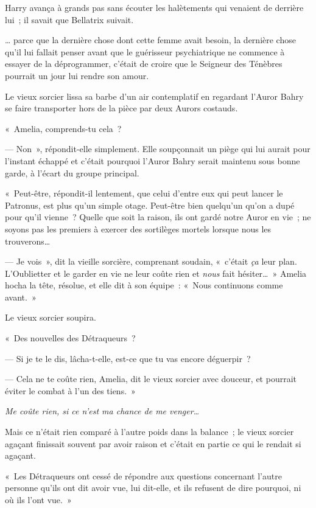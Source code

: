 Harry avança à grands pas sans écouter les halètements qui venaient de derrière lui~; il savait que Bellatrix suivait.

… parce que la dernière chose dont cette femme avait besoin, la dernière chose qu'il lui fallait penser avant que le guérisseur psychiatrique ne commence à essayer de la déprogrammer, c'était de croire que le Seigneur des Ténèbres pourrait un jour lui rendre son amour.

\later

Le vieux sorcier lissa sa barbe d'un air contemplatif en regardant l'Auror Bahry se faire transporter hors de la pièce par deux Aurors costauds.

«~Amelia, comprends-tu cela~?

--- Non~», répondit-elle simplement. Elle soupçonnait un piège qui lui aurait pour l'instant échappé et c'était pourquoi l'Auror Bahry serait maintenu sous bonne garde, à l'écart du groupe principal.

«~Peut-être, répondit-il lentement, que celui d'entre eux qui peut lancer le Patronus, est plus qu'un simple otage. Peut-être bien quelqu'un qu'on a dupé pour qu'il vienne~? Quelle que soit la raison, ils ont gardé notre Auror en vie~; ne soyons pas les premiers à exercer des sortilèges mortels lorsque nous les trouverons…

--- Je vois~», dit la vieille sorcière, comprenant soudain, «~c'était \emph{ça} leur plan. L'Oublietter et le garder en vie ne leur coûte rien et \emph{nous} fait hésiter…~» Amelia hocha la tête, résolue, et elle dit à son équipe~: «~Nous continuons comme avant.~»

Le vieux sorcier soupira.

«~Des nouvelles des Détraqueurs~?

--- Si je te le dis, lâcha-t-elle, est-ce que tu vas encore déguerpir~?

--- Cela ne te coûte rien, Amelia, dit le vieux sorcier avec douceur, et pourrait éviter le combat à l'un des tiens.~»

\emph{Me coûte rien, si ce n'est ma chance de me venger…}

Mais ce n'était rien comparé à l'autre poids dans la balance~; le vieux sorcier agaçant finissait souvent par avoir raison et c'était en partie ce qui le rendait si agaçant.

«~Les Détraqueurs ont cessé de répondre aux questions concernant l'autre personne qu'ils ont dit avoir vue, lui dit-elle, et ils refusent de dire pourquoi, ni où ils l'ont vue.~»

